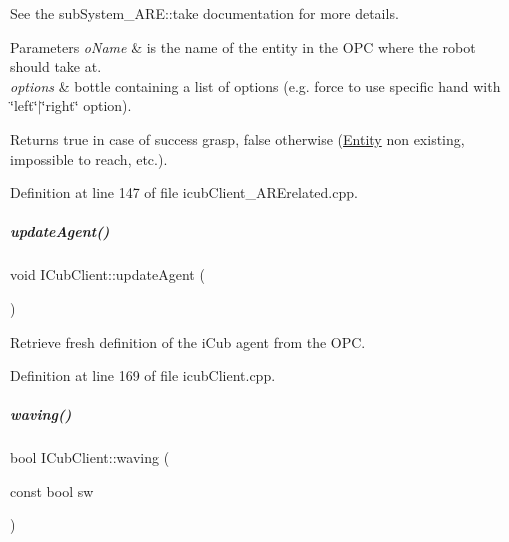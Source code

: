 See the sub\+System\+\_\+\+A\+R\+E\+::take documentation for more details. 
\begin{DoxyParams}{Parameters}
{\em o\+Name} & is the name of the entity in the O\+PC where the robot should take at. \\
\hline
{\em options} & bottle containing a list of options (e.\+g. force to use specific hand with \char`\"{}left\char`\"{}$\vert$\char`\"{}right\char`\"{} option). \\
\hline
\end{DoxyParams}
\begin{DoxyReturn}{Returns}
true in case of success grasp, false otherwise (\hyperlink{group__icubclient__representations_classicubclient_1_1Entity}{Entity} non existing, impossible to reach, etc.). 
\end{DoxyReturn}


Definition at line 147 of file icub\+Client\+\_\+\+A\+R\+Erelated.\+cpp.

\mbox{\label{group__icubclient__clients_a965d41811ec54d656fa58222ac1b13de}} 
\subparagraph{\texorpdfstring{update\+Agent()}{updateAgent()}}
{\footnotesize\ttfamily void I\+Cub\+Client\+::update\+Agent (\begin{DoxyParamCaption}{ }\end{DoxyParamCaption})}



Retrieve fresh definition of the i\+Cub agent from the O\+PC. 



Definition at line 169 of file icub\+Client.\+cpp.

\mbox{\label{group__icubclient__clients_a5cca1bace5eab90ed0e9618e7939b949}} 
\subparagraph{\texorpdfstring{waving()}{waving()}}
{\footnotesize\ttfamily bool I\+Cub\+Client\+::waving (\begin{DoxyParamCaption}\item[{const bool}]{sw }\end{DoxyParamCaption})}



